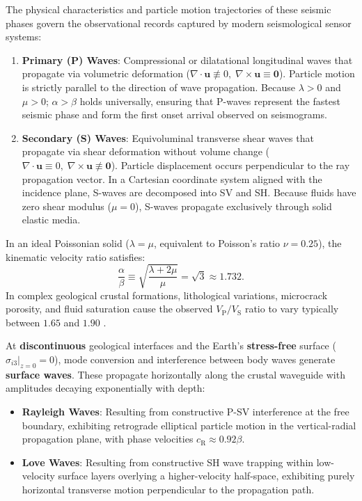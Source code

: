 The physical characteristics and particle motion trajectories of these seismic
phases govern the observational records captured by modern seismological sensor
systems:
\begin{enumerate}[label=(\alph*)]
  \item \textbf{Primary (P) Waves}: Compressional or dilatational longitudinal
    waves that propagate via volumetric deformation ($\nabla \cdot \mathbf{u}
    \not\equiv 0, \; \nabla \times \mathbf{u} \equiv \mathbf{0}$). Particle
    motion is strictly parallel to the direction of wave propagation. Because
    $\lambda > 0$ and $\mu > 0$; $\alpha > \beta$ holds universally, ensuring
    that P-waves represent the fastest seismic phase and form the first onset
    arrival observed on seismograms.
  \item \textbf{Secondary (S) Waves}: Equivoluminal transverse shear waves that
    propagate via shear deformation without volume change
    ($\nabla \cdot \mathbf{u} \equiv 0, \; \nabla \times \mathbf{u} \not\equiv
    \mathbf{0}$). Particle displacement occurs perpendicular to the ray
    propagation vector. In a Cartesian coordinate system aligned with the
    incidence plane, S-waves are decomposed into \ac{SV} and \ac{SH}.
    Because fluids have zero shear modulus ($\mu = 0$), S-waves propagate
    exclusively through solid elastic media.
\end{enumerate}

In an ideal Poissonian solid ($\lambda = \mu$, equivalent to Poisson's ratio
$\nu = \num{0.25}$), the kinematic velocity ratio satisfies:
\begin{equation}
  \frac{\alpha}{\beta} \equiv \sqrt{\frac{\lambda + 2\mu}{\mu}} = \sqrt{3}
  \approx \num{1.732}.
  \label{eq:poisson_ratio}
\end{equation}
In complex geological crustal formations, lithological variations, microcrack
porosity, and fluid saturation cause the observed
$V_{\mathrm{P}}/V_{\mathrm{S}}$ ratio to vary typically between $\num{1.65}$
and $\num{1.90}$ .

At \textbf{discontinuous} geological interfaces and the Earth's
\textbf{stress-free} surface ($\sigma_{i3}|_{z = 0} = 0$), mode conversion and
interference between body waves generate \textbf{surface waves}. These
propagate horizontally along the crustal waveguide with amplitudes decaying
exponentially with depth:
\begin{itemize}
  \item \textbf{Rayleigh Waves}: Resulting from constructive P-\ac{SV}
    interference at the free boundary, exhibiting retrograde elliptical
    particle motion in the vertical-radial propagation plane, with phase
    velocities $c_{\mathrm{R}} \approx \num{0.92}\beta$.
  \item \textbf{Love Waves}: Resulting from constructive \ac{SH} wave trapping
    within low-velocity surface layers overlying a higher-velocity half-space,
    exhibiting purely horizontal transverse motion perpendicular to the
    propagation path.
\end{itemize}

